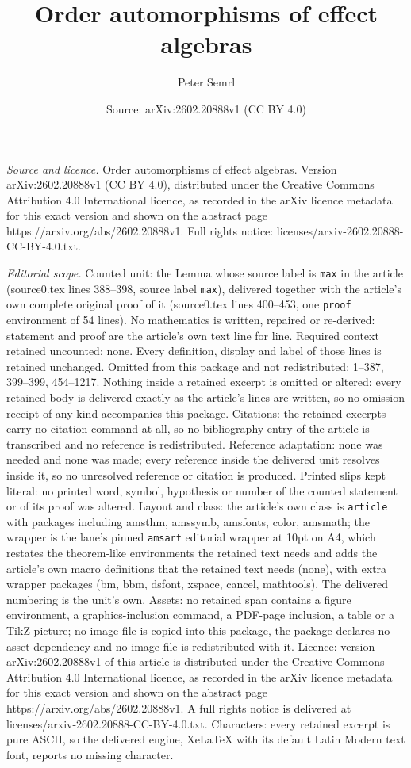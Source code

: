 \documentclass[10pt,a4paper]{amsart}
\title[Order automorphisms of effect algebras]{Order automorphisms of effect algebras}
\author{Peter Semrl}
\date{Source: arXiv:2602.20888v1 (CC BY 4.0)}
\begin{document}
\maketitle

\noindent\emph{Source and licence.} Order automorphisms of effect algebras. Version arXiv:2602.20888v1 (CC BY 4.0), distributed under the Creative Commons Attribution 4.0 International licence, as recorded in the arXiv licence metadata for this exact version and shown on the abstract page https://arxiv.org/abs/2602.20888v1. Full rights notice: licenses/arxiv-2602.20888-CC-BY-4.0.txt.\par\smallskip

\noindent\textit{Editorial scope.} Counted unit: the Lemma whose source label is \texttt{max} in the article (source0.tex lines 388--398, source label \texttt{max}), delivered together with the article's own complete original proof of it (source0.tex lines 400--453, one \texttt{proof} environment of 54 lines). No mathematics is written, repaired or re-derived: statement and proof are the article's own text line for line. Required context retained uncounted: none. Every definition, display and label of those lines is retained unchanged. Omitted from this package and not redistributed: 1--387, 399--399, 454--1217. Nothing inside a retained excerpt is omitted or altered: every retained body is delivered exactly as the article's lines are written, so no omission receipt of any kind accompanies this package. Citations: the retained excerpts carry no citation command at all, so no bibliography entry of the article is transcribed and no reference is redistributed. Reference adaptation: none was needed and none was made; every reference inside the delivered unit resolves inside it, so no unresolved reference or citation is produced. Printed slips kept literal: no printed word, symbol, hypothesis or number of the counted statement or of its proof was altered. Layout and class: the article's own class is \texttt{article} with packages including amsthm, amssymb, amsfonts, color, amsmath; the wrapper is the lane's pinned \texttt{amsart} editorial wrapper at 10pt on A4, which restates the theorem-like environments the retained text needs and adds the article's own macro definitions that the retained text needs (none), with extra wrapper packages (bm, bbm, dsfont, xspace, cancel, mathtools). The delivered numbering is the unit's own. Assets: no retained span contains a figure environment, a graphics-inclusion command, a PDF-page inclusion, a table or a TikZ picture; no image file is copied into this package, the package declares no asset dependency and no image file is redistributed with it. Licence: version arXiv:2602.20888v1 of this article is distributed under the Creative Commons Attribution 4.0 International licence, as recorded in the arXiv licence metadata for this exact version and shown on the abstract page https://arxiv.org/abs/2602.20888v1. A full rights notice is delivered at licenses/arxiv-2602.20888-CC-BY-4.0.txt. Characters: every retained excerpt is pure ASCII, so the delivered engine, XeLaTeX with its default Latin Modern text font, reports no missing character.
\end{document}
